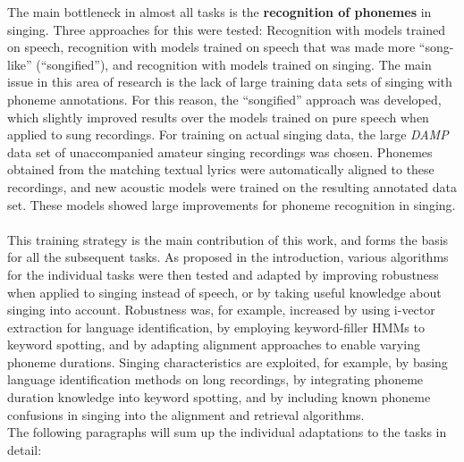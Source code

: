 The main bottleneck in almost all tasks is the \textbf{recognition of phonemes} in singing. Three approaches for this were tested: Recognition with models trained on speech, recognition with models trained on speech that was made more ``song-like'' (``songified''), and recognition with models trained on singing. The main issue in this area of research is the lack of large training data sets of singing with phoneme annotations. For this reason, the ``songified'' approach was developed, which slightly improved results over the models trained on pure speech when applied to sung recordings. For training on actual singing data, the large \textit{DAMP} data set of unaccompanied amateur singing recordings was chosen. Phonemes obtained from the matching textual lyrics were automatically aligned to these recordings, and new acoustic models were trained on the resulting annotated data set. These models showed large improvements for phoneme recognition in singing.\\\\
This training strategy is the main contribution of this work, and forms the basis for all the subsequent tasks. As proposed in the introduction, various algorithms for the individual tasks were then tested and adapted by improving robustness when applied to singing instead of speech, or by taking useful knowledge about singing into account. Robustness was, for example, increased by using i-vector extraction for language identification, by employing keyword-filler HMMs to keyword spotting, and by adapting alignment approaches to enable varying phoneme durations. Singing characteristics are exploited, for example, by basing language identification methods on long recordings, by integrating phoneme duration knowledge into keyword spotting, and by including known phoneme confusions in singing into the alignment and retrieval algorithms.\\
The following paragraphs will sum up the individual adaptations to the tasks in detail:\\

